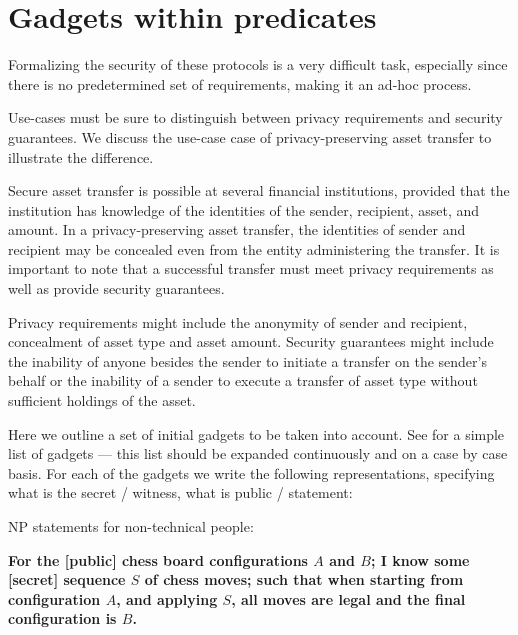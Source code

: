 \section{Gadgets within predicates}
\label{apps:gadgets-within-predicates}

Formalizing the security of these protocols is a very difficult task, especially since there is no predetermined set of requirements, making it an ad-hoc process.

Use-cases must be sure to distinguish between privacy requirements and security guarantees.
We discuss the use-case case of privacy-preserving asset transfer to illustrate the difference.

Secure asset transfer is possible at several financial institutions, provided that the institution has knowledge of the identities of the sender, recipient, asset, and amount.
In a privacy-preserving asset transfer, the identities of sender and recipient may be concealed even from the entity administering the transfer.
It is important to note that a successful transfer must meet privacy requirements as well as provide security guarantees.

Privacy requirements might include the anonymity of sender and recipient, concealment of asset type and asset amount.
Security guarantees might include the inability of anyone besides the sender to initiate a transfer on the sender's behalf or the inability of a sender to execute a transfer of asset type without sufficient holdings of the asset. 

Here we outline a set of initial gadgets to be taken into account.
See  for a simple list of gadgets --- this list should be expanded continuously and on a case by case basis.
For each of the gadgets we write the following representations, specifying what is the secret / witness, what is public / statement:

NP statements for non-technical people:

\hfill\begin{minipage}{.92\textwidth}\bfseries
	For the [public] chess board configurations $A$ and $B$;\newline
	I know some [secret] sequence $S$ of chess moves;\newline
	such that when starting from configuration $A$, and applying $S$, all moves are legal and the final configuration is $B$.
\end{minipage}

